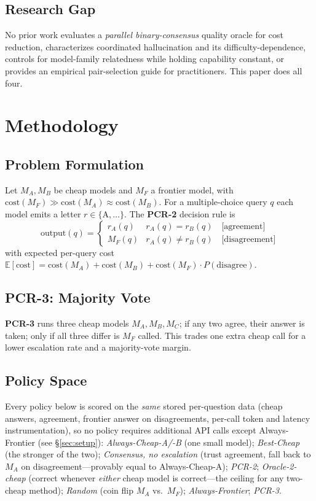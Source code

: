 \documentclass[conference]{IEEEtran}
\begin{document}
\subsection{Research Gap}
No prior work evaluates a \textit{parallel binary-consensus} quality oracle for
cost reduction, characterizes coordinated hallucination and its
difficulty-dependence, controls for model-family relatedness while holding
capability constant, or provides an empirical pair-selection guide for
practitioners. This paper does all four.

\section{Methodology}

\subsection{Problem Formulation}
Let $M_A, M_B$ be cheap models and $M_F$ a frontier model, with
$\text{cost}(M_F)\gg\text{cost}(M_A)\approx\text{cost}(M_B)$. For a
multiple-choice query $q$ each model emits a letter $r\in\{$A$,\dots\}$. The
\textbf{PCR-2} decision rule is
\begin{equation}
\text{output}(q)=\begin{cases}
r_A(q) & r_A(q)=r_B(q)\quad\text{[agreement]}\\
M_F(q) & r_A(q)\neq r_B(q)\quad\text{[disagreement]}
\end{cases}
\end{equation}
with expected per-query cost
$\mathbb{E}[\text{cost}]=\text{cost}(M_A)+\text{cost}(M_B)+\text{cost}(M_F)\cdot P(\text{disagree})$.

\subsection{PCR-3: Majority Vote}
\textbf{PCR-3} runs three cheap models $M_A,M_B,M_C$; if any two agree, their
answer is taken; only if all three differ is $M_F$ called. This trades one
extra cheap call for a lower escalation rate and a majority-vote margin.

\subsection{Policy Space}
Every policy below is scored on the \textit{same} stored per-question data
(cheap answers, agreement, frontier answer on disagreements, per-call token and
latency instrumentation), so no policy requires additional API calls except
Always-Frontier (see \S\ref{sec:setup}):
\emph{Always-Cheap-A/-B} (one small model);
\emph{Best-Cheap} (the stronger of the two);
\emph{Consensus, no escalation} (trust agreement, fall back to $M_A$ on
disagreement---provably equal to Always-Cheap-A);
\emph{PCR-2}; \emph{Oracle-2-cheap} (correct whenever \textit{either} cheap
model is correct---the ceiling for any two-cheap method);
\emph{Random} (coin flip $M_A$ vs.\ $M_F$);
\emph{Always-Frontier}; \emph{PCR-3}.
\end{document}
